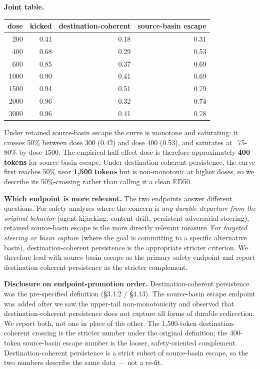 \documentclass{article}
\theoremstyle{plain}
\theoremstyle{definition}
\begin{document}
\textbf{Joint table.}

\begin{table}[h!]
\centering
\small
\begin{tabular}{rrrr}
\toprule
dose & kicked & destination-coherent & source-basin escape \\
\midrule
200 & 0.41 & 0.18 & 0.31 \\
400 & 0.68 & 0.29 & 0.53 \\
600 & 0.85 & 0.37 & 0.69 \\
1000 & 0.90 & 0.41 & 0.69 \\
1500 & 0.94 & 0.51 & 0.79 \\
2000 & 0.96 & 0.32 & 0.74 \\
3000 & 0.96 & 0.41 & 0.78 \\
\bottomrule
\end{tabular}
\end{table}

Under retained source-basin escape the curve is monotone and saturating: it crosses 50\% between dose 300 (0.42) and dose 400 (0.53), and saturates at ~75-80\% by dose 1500. The empirical half-effect dose is therefore approximately \textbf{400 tokens} for source-basin escape. Under destination-coherent persistence, the curve first reaches 50\% near \textbf{1,500 tokens} but is non-monotonic at higher doses, so we describe its 50\%-crossing rather than calling it a clean ED50.

\textbf{Which endpoint is more relevant.} The two endpoints answer different questions. For safety analyses where the concern is \textit{any durable departure from the original behavior} (agent hijacking, content drift, persistent adversarial steering), retained source-basin escape is the more directly relevant measure. For \textit{targeted steering or basin capture} (where the goal is committing to a specific alternative basin), destination-coherent persistence is the appropriate stricter criterion. We therefore lead with source-basin escape as the primary safety endpoint and report destination-coherent persistence as the stricter complement.

\textbf{Disclosure on endpoint-promotion order.} Destination-coherent persistence was the pre-specified definition (§3.1.2 / §4.13). The source-basin escape endpoint was added after we saw the upper-tail non-monotonicity and observed that destination-coherent persistence does not capture all forms of durable redirection. We report both, not one in place of the other. The 1,500-token destination-coherent crossing is the stricter number under the original definition; the 400-token source-basin escape number is the looser, safety-oriented complement. Destination-coherent persistence is a strict subset of source-basin escape, so the two numbers describe the same data — not a re-fit.
\end{document}
